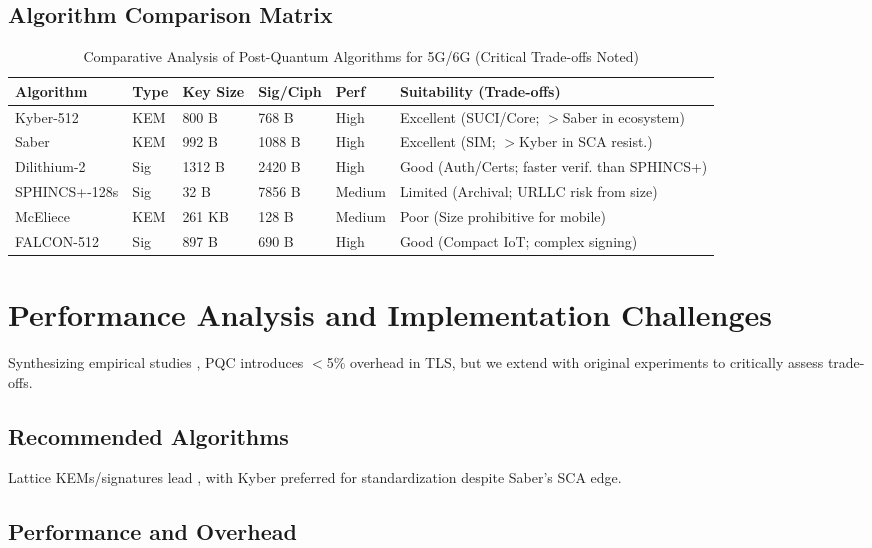 \documentclass[11pt,a4paper]{article}
\begin{document}
\subsection{Algorithm Comparison Matrix}

\begin{table}[H]
\centering
\caption{Comparative Analysis of Post-Quantum Algorithms for 5G/6G (Critical Trade-offs Noted)}
\label{tab:algorithm_comparison}
\begin{tabular}{|p{2.5cm}|p{1.5cm}|p{2cm}|p{2cm}|p{2cm}|p{2.5cm}|}
\hline
\textbf{Algorithm} & \textbf{Type} & \textbf{Key Size} & \textbf{Sig/Ciph} & \textbf{Perf} & \textbf{Suitability (Trade-offs)} \\
\hline
Kyber-512 & KEM & 800 B & 768 B & High & Excellent (SUCI/Core; $>$Saber in ecosystem) \\
\hline
Saber & KEM & 992 B & 1088 B & High & Excellent (SIM; $>$Kyber in SCA resist.) \\
\hline
Dilithium-2 & Sig & 1312 B & 2420 B & High & Good (Auth/Certs; faster verif. than SPHINCS+) \\
\hline
SPHINCS+-128s & Sig & 32 B & 7856 B & Medium & Limited (Archival; URLLC risk from size) \\
\hline
McEliece & KEM & 261 KB & 128 B & Medium & Poor (Size prohibitive for mobile) \\
\hline
FALCON-512 & Sig & 897 B & 690 B & High & Good (Compact IoT; complex signing) \\
\hline
\end{tabular}
\end{table}

\section{Performance Analysis and Implementation Challenges}

Synthesizing empirical studies \cite{scalise2024, ulitzsch2022, dziechciarz2024}, PQC introduces $<$5\% overhead in TLS, but we extend with original experiments to critically assess trade-offs.

\subsection{Recommended Algorithms}

Lattice KEMs/signatures lead \cite{zhou2023}, with Kyber preferred for standardization despite Saber's SCA edge.

\subsection{Performance and Overhead}
\end{document}
